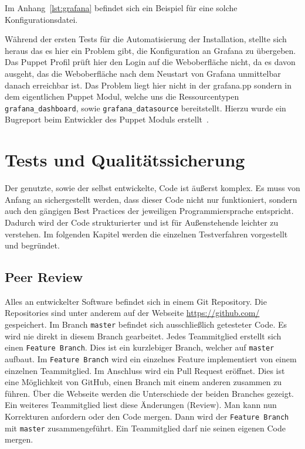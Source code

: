 Im Anhang~\ref{lst:grafana} befindet sich ein Beispiel für eine solche
Konfigurationsdatei.

Während der ersten Tests für die Automatisierung der Installation, stellte sich
heraus das es hier ein Problem gibt, die Konfiguration an Grafana zu übergeben.
Das Puppet Profil prüft hier den Login auf die Weboberfläche nicht, da es davon
ausgeht, das die Weboberfläche nach dem Neustart von Grafana unmittelbar danach
erreichbar ist. Das Problem liegt hier nicht in der grafana.pp sondern in dem
eigentlichen Puppet Modul, welche uns die Ressourcentypen
\texttt{grafana\_dashboard}, sowie \texttt{grafana\_datasource} bereitstellt.
Hierzu wurde ein Bugreport beim Entwickler des Puppet Moduls
erstellt~\cite{grafana-issue}.
\mr%

\chapter{Tests und Qualitätssicherung}
Der genutzte, sowie der selbst entwickelte, Code ist äußerst komplex. Es
muss von Anfang an sichergestellt werden, dass dieser Code nicht nur
funktioniert, sondern auch den gängigen Best Practices der jeweiligen
Programmiersprache entspricht. Dadurch wird der Code strukturierter und
ist für Außenstehende leichter zu verstehen. Im folgenden Kapitel werden die
einzelnen Testverfahren vorgestellt und begründet.
\tm%

\section{Peer Review}
Alles an entwickelter Software befindet sich in einem \gls{Git}
\gls{Repository}. Die Repositories sind unter anderem auf der Webseite
\url{https://github.com/} gespeichert. Im Branch \texttt{master} befindet sich
ausschließlich getesteter Code. Es wird nie direkt in diesem Branch gearbeitet.
Jedes Teammitglied erstellt sich einen \texttt{Feature Branch}. Dies ist ein
kurzlebiger Branch, welcher auf \texttt{master} aufbaut. Im \texttt{Feature
Branch} wird ein einzelnes Feature implementiert von einem einzelnen
Teammitglied. Im Anschluss wird ein Pull Request eröffnet. Dies ist eine
Möglichkeit von GitHub, einen Branch mit einem anderen zusammen zu führen. Über
die Webseite werden die Unterschiede der beiden Branches gezeigt. Ein weiteres
Teammitglied liest diese Änderungen (Review). Man kann nun Korrekturen
anfordern oder den Code mergen. Dann wird der \texttt{Feature Branch} mit
\texttt{master} zusammengeführt. Ein Teammitglied darf nie seinen eigenen Code
mergen.
\tm%

